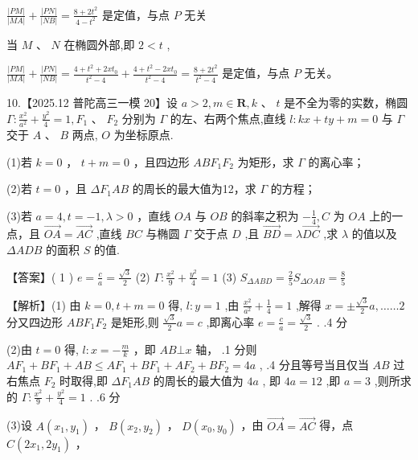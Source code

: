 \documentclass[10pt]{article}
\begin{document}
\(\frac{\left| PM\right| }{\left| MA\right| } + \frac{\left| PN\right| }{\left| NB\right| } = \frac{8 + 2{t}^{2}}{4 - {t}^{2}}\) 是定值，与点 \(P\) 无关

当 \(M\text{ 、 }N\) 在椭圆外部,即 \(2 < t\) ,

\(\frac{\left| PM\right| }{\left| MA\right| } + \frac{\left| PN\right| }{\left| NB\right| } = \frac{4 + {t}^{2} + {2x}{t}_{0}}{{t}^{2} - 4} + \frac{4 + {t}^{2} - {2x}{t}_{0}}{{t}^{2} - 4} = \frac{8 + 2{t}^{2}}{{t}^{2} - 4}\) 是定值，与点 \(P\) 无关。

10.【2025.12 普陀高三一模 20】设 \(a > 2,m \in  \mathbf{R},k\text{ 、 }t\) 是不全为零的实数，椭圆 \(\Gamma  : \frac{{x}^{2}}{{a}^{2}} + \frac{{y}^{2}}{4} = 1,{F}_{1}\text{ 、 }{F}_{2}\) 分别为 \(\Gamma\) 的左、右两个焦点,直线 \(l : {kx} + {ty} + m = 0\) 与 \(\Gamma\) 交于 \(A\text{ 、 }B\) 两点, \(O\) 为坐标原点.

(1)若 \(k = 0\) ， \(t + m = 0\) ，且四边形 \({AB}{F}_{1}{F}_{2}\) 为矩形，求 \(\Gamma\) 的离心率；

(2)若 \(t = 0\) ，且 \(\Delta {F}_{1}{AB}\) 的周长的最大值为12，求 \(\Gamma\) 的方程；

(3)若 \(a = 4,t =  - 1,\lambda  > 0\) ，直线 \({OA}\) 与 \({OB}\) 的斜率之积为 \(- \frac{1}{4},C\) 为 \({OA}\) 上的一点，且 \(\overrightarrow{OA} = \overrightarrow{AC}\) ,直线 \({BC}\) 与椭圆 \(\Gamma\) 交于点 \(D\) ,且 \(\overrightarrow{BD} = \lambda \overrightarrow{DC}\) ,求 \(\lambda\) 的值以及 \({\Delta ADB}\) 的面积 \(S\) 的值.

【答案】( 1 ) \(e = \frac{c}{a} = \frac{\sqrt{3}}{2}\) (2) \(\Gamma  : \frac{{x}^{2}}{9} + \frac{{y}^{2}}{4} = 1\) (3) \({S}_{\Delta ABD} = \frac{2}{5}{S}_{\Delta OAB} = \frac{8}{5}\)

【解析】(1) 由 \(k = 0,t + m = 0\) 得, \(l : y = 1\) ,由 \(\frac{{x}^{2}}{{a}^{2}} + \frac{1}{4} = 1\) ,解得 \(x =  \pm  \frac{\sqrt{3}}{2}a,\ldots \ldots 2\) 分又四边形 \({AB}{F}_{1}{F}_{2}\) 是矩形,则 \(\frac{\sqrt{3}}{2}a = c\) ,即离心率 \(e = \frac{c}{a} = \frac{\sqrt{3}}{2}\) . .4 分

(2)由 \(t = 0\) 得, \(l : x =  - \frac{m}{k}\) ，即 \({AB}\bot x\) 轴， .1 分则 \(A{F}_{1} + B{F}_{1} + {AB} \leq  A{F}_{1} + B{F}_{1} + A{F}_{2} + B{F}_{2} = {4a}\) , .4 分且等号当且仅当 \({AB}\) 过右焦点 \({F}_{2}\) 时取得,即 \(\Delta {F}_{1}{AB}\) 的周长的最大值为 \({4a}\) , 即 \({4a} = {12}\) ,即 \(a = 3\) ,则所求的 \(\Gamma  : \frac{{x}^{2}}{9} + \frac{{y}^{2}}{4} = 1\) . .6 分

(3)设 \(A\left( {{x}_{1},{y}_{1}}\right)\) ， \(B\left( {{x}_{2},{y}_{2}}\right)\) ， \(D\left( {{x}_{0},{y}_{0}}\right)\) ，由 \(\overrightarrow{OA} = \overrightarrow{AC}\) 得，点 \(C\left( {2{x}_{1},2{y}_{1}}\right)\) ，
\end{document}
